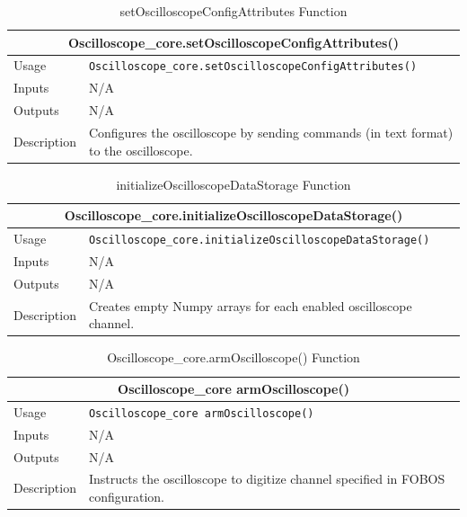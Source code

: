 \documentclass{llncs}
\numberwithin{algorithm}{chapter}
\begin{document}
\begin{table}
\caption{setOscilloscopeConfigAttributes Function}
\begin{tabular}{ |p{2cm}||p{11cm}|  }
 \hline
 \multicolumn{2}{|c|}{\cellcolor{teal}\textbf{Oscilloscope\_core.setOscilloscopeConfigAttributes()}} \\
 \hline
 Usage & \texttt{Oscilloscope\_core.setOscilloscopeConfigAttributes()}\\ \hline
 Inputs & N/A  \\ \hline
 Outputs &  N/A \\ \hline
 Description & Configures the oscilloscope by sending commands (in text format) to the oscilloscope. \\ \hline
\end{tabular}
\end{table}

\begin{table}
\caption{initializeOscilloscopeDataStorage Function}
\begin{tabular}{ |p{2cm}||p{11cm}|  }
 \hline
 \multicolumn{2}{|c|}{\cellcolor{teal}\textbf{Oscilloscope\_core.initializeOscilloscopeDataStorage()}} \\
 \hline
 Usage & \texttt{Oscilloscope\_core.initializeOscilloscopeDataStorage()}\\ \hline
 Inputs & N/A \\ \hline
 Outputs &  N/A \\ \hline
 Description & Creates empty Numpy arrays for each enabled oscilloscope channel. \\ \hline
\end{tabular}
\end{table}

\begin{table}
\caption{Oscilloscope_core.armOscilloscope() Function}
\begin{tabular}{ |p{2cm}||p{11cm}|  }
 \hline
 \multicolumn{2}{|c|}{\cellcolor{teal}\textbf{Oscilloscope\_core armOscilloscope()}} \\
 \hline
 Usage & \texttt{Oscilloscope\_core armOscilloscope()}\\ \hline
 Inputs & N/A \\ \hline
 Outputs &  N/A \\ \hline
 Description & Instructs the oscilloscope to digitize channel specified in FOBOS configuration. \\ \hline
\end{tabular}
\end{table}
\end{document}
